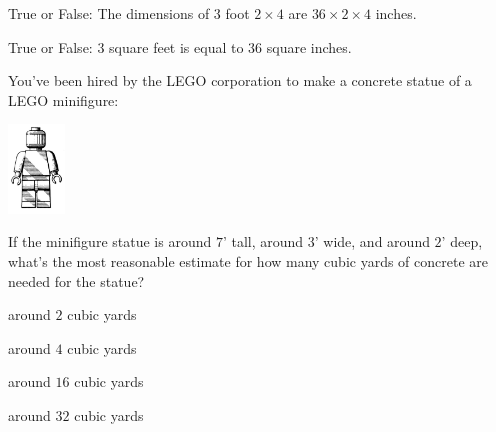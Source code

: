 \documentclass{ximera}
\author{Bart Snapp}
\begin{document}
\maketitle



\begin{exercise}
  True or False: The dimensions of $3$ foot $2\times 4$ are $36\times
  2\times 4$ inches.
\end{exercise}
\vfill

\begin{exercise}
  True or False: $3$ square feet is equal to $36$ square inches.
 \end{exercise}
\vfill

\begin{exercise}
  You've been hired by the LEGO corporation to make a concrete statue
  of a LEGO minifigure:
  \begin{center}
    \includegraphics[width=1.5cm]{minifigure.png}
  \end{center}
  If the minifigure statue is around $7$' tall, around $3$' wide, and
  around $2$' deep, what's the most reasonable estimate for how many
  cubic yards of concrete are needed for the statue?
  \begin{enumerate}\begin{multicols}{2}
  \item around $2$ cubic yards
  \item around $4$ cubic yards
  \item around $16$ cubic yards
  \item around $32$ cubic yards
    \end{multicols}
  \end{enumerate}
\end{exercise}
\end{document}
